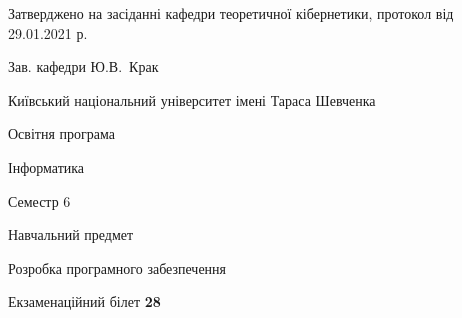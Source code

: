 \documentclass[10pt, ukrainian]{article}
\begin{document}
{\vspace{5mm}\smallskip \begin {small} Затверджено на засіданні кафедри теоретичної кібернетики, протокол  від   29.01.2021 р.\par\smallskip\smallskip
{\parbox {6.5 cm}{Зав. кафедри \dotfill Ю.В.~Крак}} \end{small}}
\newpage

{{\begin {small}\par
{ \center  Київський національний університет імені Тараса Шевченка \par}
{\parbox {5 cm}{Освітня програма \hfill}{\parbox {7 cm}{Інформатика \hfill}}\parbox {6 cm}{\hfill Семестр 6}}\par
{\parbox {5 cm} {Навчальний предмет \hfill}\parbox {7 cm}{Розробка програмного забезпечення \hfill}\parbox {6cm}{\hfill}\par}\vspace{-7pt} \end{small}}{\center Екзаменаційний білет \No \textbf
{ 28 }\par}}
\end{document}

